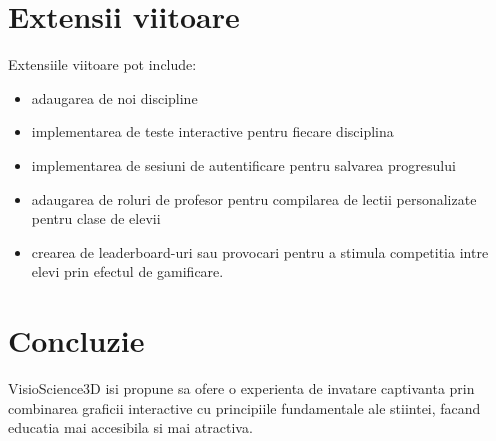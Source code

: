 \documentclass[a4paper,12pt]{article}
\begin{document}
\section*{Extensii viitoare}
Extensiile viitoare pot include:
\begin{itemize}
    \item adaugarea de noi discipline
    \item implementarea de teste interactive pentru fiecare disciplina
    \item implementarea de sesiuni de autentificare pentru salvarea progresului
    \item adaugarea de roluri de profesor pentru compilarea de lectii personalizate pentru clase de elevii
    \item crearea de leaderboard-uri sau provocari pentru a stimula competitia intre elevi prin efectul de gamificare.
\end{itemize}

\section*{Concluzie}
VisioScience3D isi propune sa ofere o experienta de invatare captivanta prin combinarea 
graficii interactive cu principiile fundamentale ale stiintei, facand educatia mai accesibila si mai atractiva.
\end{document}

